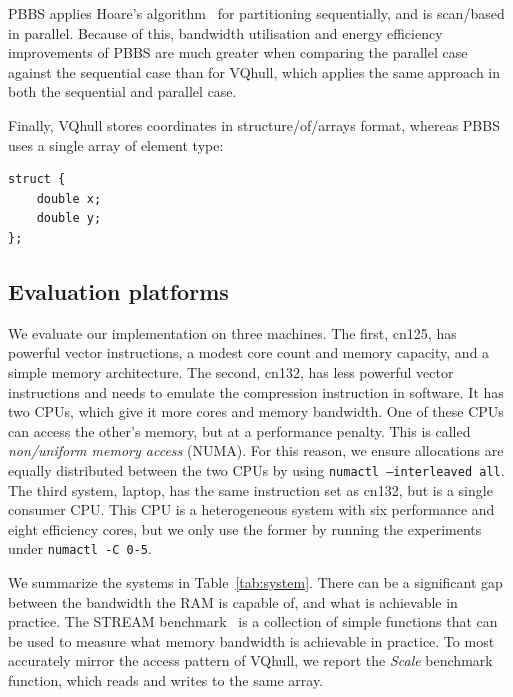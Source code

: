 \documentclass[11pt,a4paper]{article}
\begin{document}
PBBS applies Hoare's algorithm~\cite{hoare1962quick} for partitioning sequentially, and is scan\-/based~\cite{blelloch1989scans} in parallel.
Because of this, bandwidth utilisation and energy efficiency improvements of PBBS are much greater when comparing the parallel case against the sequential case than for VQhull, which applies the same approach in both the sequential and parallel case.

Finally, VQhull stores coordinates in structure\-/of\-/arrays format, whereas PBBS uses a single array of element type:
\begin{verbatim}
struct {
    double x;
    double y;
};
\end{verbatim}

\subsection{Evaluation platforms}
We evaluate our implementation on three machines.
The first, cn125, has powerful vector instructions, a modest core count and memory capacity, and a simple memory architecture.
The second, cn132, has less powerful vector instructions and needs to emulate the compression instruction in software.
It has two CPUs, which give it more cores and memory bandwidth.
One of these CPUs can access the other's memory, but at a performance penalty.
This is called \emph{non\-/uniform memory access} (NUMA).
For this reason, we ensure allocations are equally distributed between the two CPUs by using \texttt{numactl --interleaved all}.
The third system, laptop, has the same instruction set as cn132, but is a single consumer CPU.
This CPU is a heterogeneous system with six performance and eight efficiency cores, but we only use the former by running the experiments under \texttt{numactl -C 0-5}.

We summarize the systems in Table~\ref{tab:system}.
There can be a significant gap between the bandwidth the RAM is capable of, and what is achievable in practice.
The STREAM benchmark~\cite{calpin1995memory} is a collection of simple functions that can be used to measure what memory bandwidth is achievable in practice.
To most accurately mirror the access pattern of VQhull, we report the \emph{Scale} benchmark function, which reads and writes to the same array.
\end{document}
